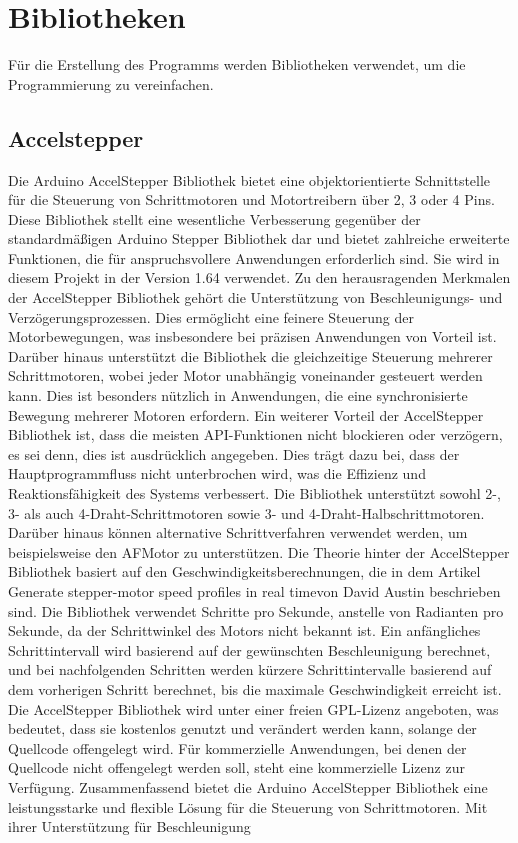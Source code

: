 {{{\begin{code}
	\caption[void handleInterrupt]{void handleInterrupt}\label{Code:void handleInterrupt}    
\end{code}

\section{Bibliotheken}
Für die Erstellung des Programms werden Bibliotheken verwendet, um die Programmierung zu vereinfachen.

\subsection{Accelstepper}

Die Arduino AccelStepper Bibliothek bietet eine objektorientierte Schnittstelle für die Steuerung von Schrittmotoren und Motortreibern über 2, 3 oder 4 Pins. Diese Bibliothek stellt eine wesentliche Verbesserung gegenüber der standardmäßigen Arduino Stepper Bibliothek dar und bietet zahlreiche erweiterte Funktionen, die für anspruchsvollere Anwendungen erforderlich sind. Sie wird in diesem Projekt in der Version 1.64 verwendet. Zu den herausragenden Merkmalen der AccelStepper Bibliothek gehört die Unterstützung von Beschleunigungs- und Verzögerungsprozessen. Dies ermöglicht eine feinere Steuerung der Motorbewegungen, was insbesondere bei präzisen Anwendungen von Vorteil ist. Darüber hinaus unterstützt die Bibliothek die gleichzeitige Steuerung mehrerer Schrittmotoren, wobei jeder Motor unabhängig voneinander gesteuert werden kann. Dies ist besonders nützlich in Anwendungen, die eine synchronisierte Bewegung mehrerer Motoren erfordern. Ein weiterer Vorteil der AccelStepper Bibliothek ist, dass die meisten API-Funktionen nicht blockieren oder verzögern, es sei denn, dies ist ausdrücklich angegeben. Dies trägt dazu bei, dass der Hauptprogrammfluss nicht unterbrochen wird, was die Effizienz und Reaktionsfähigkeit des Systems verbessert. Die Bibliothek unterstützt sowohl 2-, 3- als auch 4-Draht-Schrittmotoren sowie 3- und 4-Draht-Halbschrittmotoren. Darüber hinaus können alternative Schrittverfahren verwendet werden, um beispielsweise den AFMotor zu unterstützen. Die Theorie hinter der AccelStepper Bibliothek basiert auf den Geschwindigkeitsberechnungen, die in dem Artikel \glqq Generate stepper-motor speed profiles in real time\grqq von David Austin beschrieben sind. Die Bibliothek verwendet Schritte pro Sekunde, anstelle von Radianten pro Sekunde, da der Schrittwinkel des Motors nicht bekannt ist. Ein anfängliches Schrittintervall wird basierend auf der gewünschten Beschleunigung berechnet, und bei nachfolgenden Schritten werden kürzere Schrittintervalle basierend auf dem vorherigen Schritt berechnet, bis die maximale Geschwindigkeit erreicht ist. Die AccelStepper Bibliothek wird unter einer freien GPL-Lizenz angeboten, was bedeutet, dass sie kostenlos genutzt und verändert werden kann, solange der Quellcode offengelegt wird. Für kommerzielle Anwendungen, bei denen der Quellcode nicht offengelegt werden soll, steht eine kommerzielle Lizenz zur Verfügung. Zusammenfassend bietet die Arduino AccelStepper Bibliothek eine leistungsstarke und flexible Lösung für die Steuerung von Schrittmotoren. Mit ihrer Unterstützung für Beschleunigung }}}

